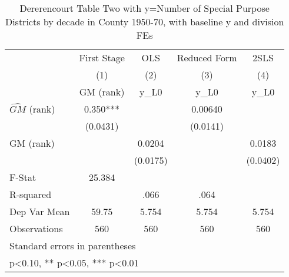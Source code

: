 \begin{table}[htbp]\centering
\def\sym#1{\ifmmode^{#1}\else\(^{#1}\)\fi}
\caption{Dererencourt Table Two with y=Number of Special Purpose Districts by decade in County 1950-70, with baseline y and division FEs}
\begin{tabular}{l*{4}{c}}
\toprule
                    & First Stage   &         OLS   &Reduced Form   &        2SLS   \\
                    &\multicolumn{1}{c}{(1)}&\multicolumn{1}{c}{(2)}&\multicolumn{1}{c}{(3)}&\multicolumn{1}{c}{(4)}\\
                    &\multicolumn{1}{c}{GM  (rank)}&\multicolumn{1}{c}{y\_L0}&\multicolumn{1}{c}{y\_L0}&\multicolumn{1}{c}{y\_L0}\\
\midrule
$\hat{GM}$ (rank)   &       0.350***&               &     0.00640   &               \\
                    &    (0.0431)   &               &    (0.0141)   &               \\
\addlinespace
GM  (rank)          &               &      0.0204   &               &      0.0183   \\
                    &               &    (0.0175)   &               &    (0.0402)   \\
\midrule
F-Stat              &      25.384   &               &               &               \\
R-squared           &               &        .066   &        .064   &               \\
Dep Var Mean        &       59.75   &       5.754   &       5.754   &       5.754   \\
Observations        &         560   &         560   &         560   &         560   \\
\bottomrule
\multicolumn{5}{l}{\footnotesize Standard errors in parentheses}\\
\multicolumn{5}{l}{\footnotesize * p<0.10, ** p<0.05, *** p<0.01}\\
\end{tabular}
\end{table}
